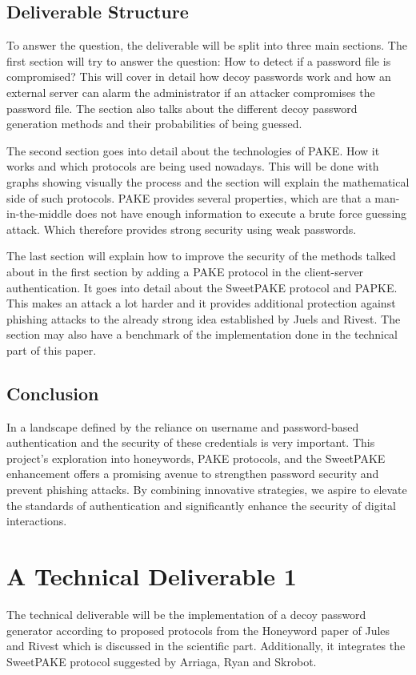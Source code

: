 \documentclass[conference,compsoc]{IEEEtran}
\begin{document}
\subsection{Deliverable Structure} To answer the question, the deliverable will
be split into three main sections. The first section will try to answer the
question: How to detect if a password file is compromised? This will cover in
detail how decoy passwords work and how an external server can alarm the
administrator if an attacker compromises the password file. The section also
talks about the different decoy password generation methods and their
probabilities of being guessed. 

The second section goes into detail about the technologies of PAKE. How it
works and which protocols are being used nowadays. This will be done with
graphs showing visually the process and the section will explain the
mathematical side of such protocols. PAKE provides several properties, which
are that a man-in-the-middle does not have enough information to execute a
brute force guessing attack. Which therefore provides strong security using
weak passwords.

The last section will explain how to improve the security of the methods talked
about in the first section by adding a PAKE protocol in the client-server
authentication. It goes into detail about the SweetPAKE \cite{sweetpake}
protocol and PAPKE\cite{papke}. This makes an attack a lot harder and it provides
additional protection against phishing attacks to the already strong idea
established by Juels and Rivest. The section may also have a benchmark of the
implementation done in the technical part of this paper.

\subsection{Conclusion} In a landscape defined by the reliance on username and
password-based authentication and the security of these credentials is very
important. This project's exploration into honeywords, PAKE protocols, and the
SweetPAKE enhancement offers a promising avenue to strengthen password security
and prevent phishing attacks. By combining innovative strategies, we aspire to
elevate the standards of authentication and significantly enhance the security
of digital interactions.

\section{A Technical Deliverable 1 } The technical deliverable will be the
implementation of a decoy password generator according to proposed protocols
from the Honeyword paper \cite{juels2013honeywords} of Jules and Rivest which is
discussed in the scientific part. Additionally, it integrates the SweetPAKE
protocol \cite{sweetpake} suggested by Arriaga, Ryan and Skrobot.
\end{document}
